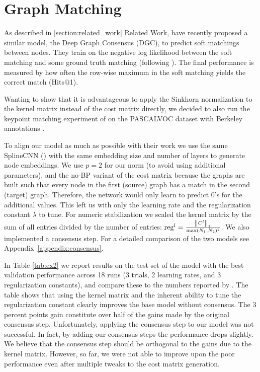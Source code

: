 \section{Graph Matching}

As described in \ref{section:related_work} Related Work, \cite{fey2020_update} have recently proposed a similar model, the Deep Graph Consensus (DGC), to predict soft matchings between nodes. They train on the negative log likelihood between the soft matching and some ground truth matching (following \citealp{wang2019}). The final performance is measured by how often the row-wise maximum in the soft matching yields the correct match (Hits@1).

Wanting to show that it is advantageous to apply the Sinkhorn normalization to the kernel matrix instead of the cost matrix directly, we decided to also run the keypoint matching experiment of \cite{fey2020_update} on the PASCALVOC  dataset \cite{pascal2010} with Berkeley annotations \cite{annotations2009}.

To align our model as much as possible with their work we use the same SplineCNN (\citealp{spline2018}) with the same embedding size and number of layers to generate node embeddings. We use $p=2$ for our norm (to avoid using additional parameters), and the no-BP variant of the cost matrix because the graphs are built such that every node in the first (source) graph has a match in the second (target) graph. Therefore, the network would only learn to predict 0’s for the additional values. This left us with only the learning rate and the regularization constant $\lambda$ to tune. For numeric stabilization we scaled the kernel matrix by the sum of all entries divided by the number of entries: $\text{reg}^l = \frac{\norm{C^l}_1}{\max(N_1,N_2)^2}$. We also implemented a consensus step. For a detailed comparison of the two models see \mbox{Appendix \ref{appendix:consensus}}.

In Table \ref{tab:ex2} we report results on the test set of the model with the best validation performance across 18 runs (3 trials, 2 learning rates, and 3 regularization constants), and compare these to the numbers reported by \cite{fey2020_update}. The table shows that using the kernel matrix and the inherent ability to tune the regularization constant clearly improves the base model without consensus. The 3 percent points gain constitute over half of the gains made by the original consensus step. Unfortunately, applying the consensus step to our model was not successful. In fact, by adding our consensus steps the performance drops slightly. We believe that the consensus step should be orthogonal to the gains due to the kernel matrix. However, so far, we were not able to improve upon the poor performance even after multiple tweaks to the cost matrix generation.


